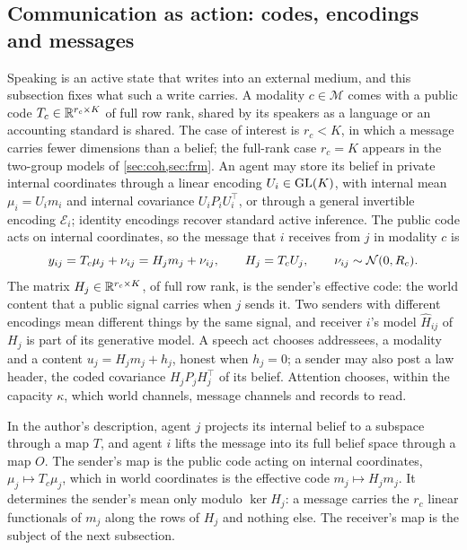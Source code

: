\subsection{Communication as action: codes, encodings and messages}\label{sec:fw-codes}

Speaking is an active state that writes into an external medium, and this subsection fixes what such a write carries. A modality $c\in\mathcal M$ comes with a public code $T_c\in\mathbb{R}^{r_c\times K}$ of full row rank, shared by its speakers as a language or an accounting standard is shared. The case of interest is $r_c<K$, in which a message carries fewer dimensions than a belief; the full-rank case $r_c=K$ appears in the two-group models of \cref{sec:coh,sec:frm}. An agent may store its belief in private internal coordinates through a linear encoding $U_i\in\mathrm{GL}(K)$, with internal mean $\mu_i=U_im_i$ and internal covariance $U_iP_iU_i^\top$, or through a general invertible encoding $\mathcal E_i$; identity encodings recover standard active inference. The public code acts on internal coordinates, so the message that $i$ receives from $j$ in modality $c$ is
\begin{equation}\label{eq:fw-message}
y_{ij}=T_c\mu_j+\nu_{ij}=H_jm_j+\nu_{ij},\qquad H_j=T_cU_j,\qquad\nu_{ij}\sim\mathcal{N}(0,R_c).
\end{equation}
The matrix $H_j\in\mathbb{R}^{r_c\times K}$, of full row rank, is the sender's effective code: the world content that a public signal carries when $j$ sends it. Two senders with different encodings mean different things by the same signal, and receiver $i$'s model $\hat H_{ij}$ of $H_j$ is part of its generative model. A speech act chooses addressees, a modality and a content $u_j=H_jm_j+h_j$, honest when $h_j=0$; a sender may also post a law header, the coded covariance $H_jP_jH_j^\top$ of its belief. Attention chooses, within the capacity $\kappa$, which world channels, message channels and records to read.

In the author's description, agent $j$ projects its internal belief to a subspace through a map $T$, and agent $i$ lifts the message into its full belief space through a map $O$. The sender's map is the public code acting on internal coordinates, $\mu_j\mapsto T_c\mu_j$, which in world coordinates is the effective code $m_j\mapsto H_jm_j$. It determines the sender's mean only modulo $\ker H_j$: a message carries the $r_c$ linear functionals of $m_j$ along the rows of $H_j$ and nothing else. The receiver's map is the subject of the next subsection.

